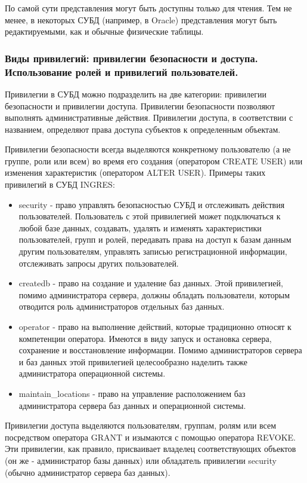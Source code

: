 По самой сути представления могут быть доступны только для чтения. Тем не менее, в некоторых СУБД (например, в Oracle) представления могут быть редактируемыми, как и обычные физические таблицы.

\subsubsection{Виды привилегий: привилегии безопасности и доступа. Использование ролей и привилегий пользователей.}
Привилегии в СУБД можно подразделить на две категории: привилегии
безопасности и привилегии доступа. Привилегии безопасности позволяют
выполнять административные действия. Привилегии доступа, в соответствии с
названием, определяют права доступа субъектов к определенным объектам.

Привилегии безопасности всегда выделяются конкретному
пользователю (а не группе, роли или всем) во время его создания (оператором
CREATE USER) или изменения характеристик (оператором ALTER USER). Примеры
таких привилегий в СУБД INGRES:
\begin{itemize}
    \item security - право управлять безопасностью СУБД и отслеживать действия
пользователей. Пользователь с этой привилегией может подключаться к любой базе
данных, создавать, удалять и изменять характеристики пользователей, групп и ролей,
передавать права на доступ к базам данным другим пользователям, управлять
записью регистрационной информации, отслеживать запросы других пользователей.
    \item createdb - право на создание и удаление баз данных. Этой привилегией,
помимо администратора сервера, должны обладать пользователи, которым отводится
роль администраторов отдельных баз данных.
    \item operator - право на выполнение действий, которые традиционно относят к
компетенции оператора. Имеются в виду запуск и остановка сервера, сохранение и
восстановление информации. Помимо администраторов сервера и баз данных этой
привилегией целесообразно наделить также администратора операционной системы.
    \item maintain\_locations - право на управление расположением баз администратора
сервера баз данных и операционной системы.
\end{itemize}

Привилегии доступа выделяются пользователям, группам, ролям или всем посредством оператора GRANT и изымаются с помощью оператора REVOKE. Эти привилегии, как правило, присваивает владелец соответствующих объектов (он же - администратор базы данных) или обладатель привилегии security (обычно администратор сервера баз данных).

